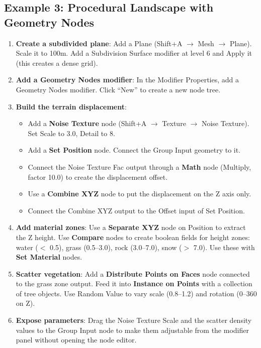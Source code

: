 \subsection{Example 3: Procedural Landscape with Geometry Nodes}
\label{sec:landscapeexample}

\begin{enumerate}[leftmargin=2em]
  \item \textbf{Create a subdivided plane}: Add a Plane (Shift+A $\rightarrow$ Mesh $\rightarrow$ Plane). Scale it to 100m. Add a Subdivision Surface modifier at level 6 and Apply it (this creates a dense grid).

  \item \textbf{Add a Geometry Nodes modifier}: In the Modifier Properties, add a Geometry Nodes modifier. Click ``New'' to create a new node tree.

  \item \textbf{Build the terrain displacement}:
  \begin{itemize}[leftmargin=2em]
    \item Add a \textbf{Noise Texture} node (Shift+A $\rightarrow$ Texture $\rightarrow$ Noise Texture). Set Scale to 3.0, Detail to 8.
    \item Add a \textbf{Set Position} node. Connect the Group Input geometry to it.
    \item Connect the Noise Texture Fac output through a \textbf{Math} node (Multiply, factor 10.0) to create the displacement offset.
    \item Use a \textbf{Combine XYZ} node to put the displacement on the Z axis only.
    \item Connect the Combine XYZ output to the Offset input of Set Position.
  \end{itemize}

  \item \textbf{Add material zones}: Use a \textbf{Separate XYZ} node on Position to extract the Z height. Use \textbf{Compare} nodes to create boolean fields for height zones: water ($<$ 0.5), grass (0.5--3.0), rock (3.0--7.0), snow ($>$ 7.0). Use these with \textbf{Set Material} nodes.

  \item \textbf{Scatter vegetation}: Add a \textbf{Distribute Points on Faces} node connected to the grass zone output. Feed it into \textbf{Instance on Points} with a collection of tree objects. Use Random Value to vary scale (0.8--1.2) and rotation (0--360 on Z).

  \item \textbf{Expose parameters}: Drag the Noise Texture Scale and the scatter density values to the Group Input node to make them adjustable from the modifier panel without opening the node editor.
\end{enumerate}

